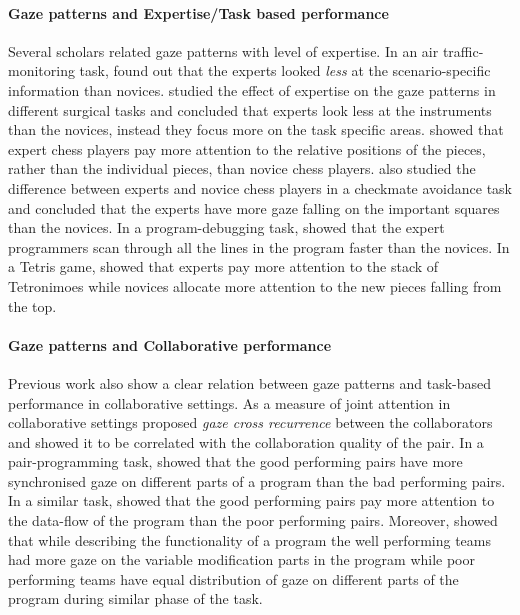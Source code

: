 \documentclass{sig-alternate}
\begin{document}
\paragraph{Gaze patterns and Expertise/Task based performance}

Several scholars related gaze patterns with level of expertise.
In an air traffic-monitoring task, \cite{hasse2012measure}  found out that the
experts looked \emph{less} at the scenario-specific information than novices.
\cite{eivazi2012gaze, law2004eye, tien2010measuring} studied the effect of
expertise on the gaze patterns in different surgical tasks and concluded that
experts look less at the instruments than the novices, instead they focus more
on the task specific areas. \cite{reingold2001visual} showed that expert chess
players pay more attention to the relative positions of the pieces, rather than
the individual pieces, than novice chess players. \cite{blignaut2008visual} also
studied the difference between experts and novice chess players in a checkmate
avoidance task and concluded that the experts have more gaze falling on the
important squares than the novices. In a program-debugging task,
\cite{sharif2012eye} showed that the expert programmers scan through all the
lines in the program faster than the novices. In a Tetris game,
\cite{jermann2010using} showed that experts pay more attention to the stack of
Tetronimoes while novices allocate more attention to the new pieces falling from
the top.

\paragraph{Gaze patterns and Collaborative performance}

Previous work also show a clear relation between gaze patterns and task-based
performance in collaborative settings. As a measure of joint attention in
collaborative settings  \cite{richardson2007art} proposed \emph{gaze cross recurrence}
between the collaborators and showed it to be correlated with the collaboration
quality of the pair. In a pair-programming task, \cite{jermann2012effects}
showed that the good performing pairs have more synchronised gaze on different
parts of a program than the bad performing pairs. In a similar task,
\cite{sharma2012gaze} showed that the good performing pairs pay more attention
to the data-flow of the program than the poor performing pairs. Moreover,
\cite{sharma2013understanding} showed that while describing the functionality of
a program the well performing teams had more gaze on the variable modification
parts in the program while poor performing teams have equal distribution of gaze
on different parts of the program during similar phase of the task.  
\end{document}
